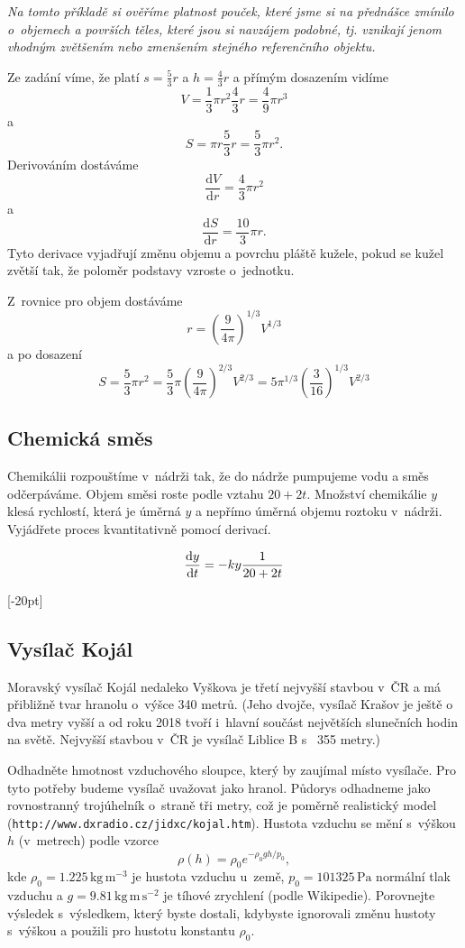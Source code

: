 \textit{Na tomto příkladě si ověříme platnost pouček, které jsme si na přednášce zmínilo o objemech a površích těles, které jsou si navzájem podobné, tj. vznikají jenom vhodným zvětšením nebo zmenšením stejného referenčního objektu.}

\reseni
Ze zadání víme, že platí $s=\frac 53 r$ a $h=\frac 43 r$ a přímým dosazením vidíme
$$V=\frac 13 \pi r^2 \frac 43 r=\frac 49 \pi r^3$$
a
$$S=\pi r \frac 53 r=\frac 53 \pi r^2.$$
Derivováním dostáváme
$$
\frac{\mathrm dV}{\mathrm dr}=\frac 43 \pi r^2
$$
a 
$$
\frac{\mathrm dS}{\mathrm dr}=\frac {10}3 \pi r.
$$
Tyto derivace vyjadřují změnu objemu a povrchu pláště kužele, pokud se kužel zvětší tak, že poloměr podstavy vzroste o jednotku.

Z rovnice pro objem dostáváme
$$r=\left(\frac {9}{4\pi}\right)^{1/3}V^{1/3}$$ a po dosazení
$$S=\frac 53 \pi r^2 = \frac 53 \pi \left(\frac {9}{4\pi}\right)^{2/3}V^{2/3}
=5\pi^{1/3}\left (\frac 3{16}\right)^{1/3} V^{2/3}$$


\konec

\subsection{Chemická směs} Chemikálii rozpouštíme v nádrži tak, že do
nádrže pumpujeme vodu a směs odčerpáváme. Objem směsi roste podle
vztahu $20+2t$. Množství chemikálie $y$ klesá rychlostí, která je
úměrná $y$ a nepřímo úměrná objemu roztoku v nádrži.
Vyjádřete proces kvantitativně pomocí derivací.


\reseni
$$\frac{\mathrm{d}y}{\mathrm{d}t}=-ky\frac1{20+2t}$$
\konec



\stranka

{
  
\def\mezera{\vspace*{-20pt}}

[-20pt]


\subsection{Vysílač Kojál} Moravský vysílač Kojál nedaleko Vyškova
je třetí nejvyšší stavbou v ČR a má přibližně tvar hranolu o výšce 340
metrů. (Jeho dvojče, vysílač Krašov je ještě o~ dva metry vyšší a od
roku 2018 tvoří i hlavní součást největších slunečních hodin na
světě. Nejvyšší stavbou v ČR je vysílač Liblice B s~ 355 metry.)

Odhadněte hmotnost vzduchového sloupce, který by zaujímal místo
vysílače. Pro tyto potřeby budeme vysílač uvažovat jako
hranol. Půdorys odhadneme jako rovnostranný trojúhelník o straně tři
metry, což je poměrně realistický model
(\texttt{http://www.dxradio.cz/jidxc/kojal.htm}). Hustota vzduchu se
mění s výškou $h$ (v metrech) podle vzorce
$$\rho(h)=\rho_0 e^{-\rho_0 g h /p_0},$$ kde
$\rho_0=1.225 \,\mathrm{kg}\,\mathrm{m}^{-3}$ je hustota vzduchu u země,
$p_0=101325\,\mathrm{Pa}$ normální tlak vzduchu a
$g=9.81\,\mathrm{kg}\,\mathrm{m}\,\mathrm{s}^{-2}$ je tíhové zrychlení (podle Wikipedie).
Porovnejte výsledek s výsledkem, který byste dostali, kdybyste
ignorovali změnu hustoty s výškou a použili pro hustotu konstantu
$\rho_0.$


}


